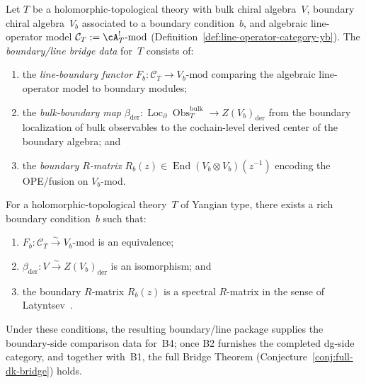 \begin{definition}
\label{def:boundary-line-bridge-data}
Let $T$ be a holomorphic-topological theory with bulk chiral
algebra~$V$, boundary chiral algebra~$V_b$ associated to a boundary
condition~$b$, and algebraic line-operator model
$\mathcal{C}_T := \cA_T^!\text{-}\mathrm{mod}$
(Definition~\ref{def:line-operator-category-yb}).
The \emph{boundary/line bridge data} for~$T$ consists of:
\begin{enumerate}[label=\textup{(\roman*)}]
\item the \emph{line-boundary functor}
 $F_b \colon \mathcal{C}_T \to V_b\text{-}\mathrm{mod}$
 comparing the algebraic line-operator model to boundary modules;
\item the \emph{bulk-boundary map}
 $\beta_{\mathrm{der}} \colon
 \operatorname{Loc}_{\partial}\operatorname{Obs}^{\mathrm{bulk}}_T
 \to Z(V_b)_{\mathrm{der}}$
 from the boundary localization of bulk observables to the
 cochain-level derived center of the boundary algebra; and
\item the \emph{boundary $R$-matrix}
 $R_b(z) \in \operatorname{End}(V_b \otimes V_b)(z^{-1})$
 encoding the OPE/fusion on $V_b$-mod.
\end{enumerate}
\end{definition}

\begin{conjecture}
\label{conj:boundary-line-bridge}
For a holomorphic-topological theory~$T$ of Yangian type, there
exists a rich boundary condition~$b$ such that:
\begin{enumerate}[label=\textup{(\alph*)}]
\item $F_b \colon \mathcal{C}_T \xrightarrow{\sim}
 V_b\text{-}\mathrm{mod}$ is an equivalence;
\item $\beta_{\mathrm{der}} \colon V \xrightarrow{\sim}
 Z(V_b)_{\mathrm{der}}$ is an isomorphism; and
\item the boundary $R$-matrix $R_b(z)$ is a spectral
 $R$-matrix in the sense of Latyntsev~\cite{Latyntsev23}.
\end{enumerate}
Under these conditions, the resulting boundary/line package supplies
the boundary-side comparison data for~B4; once B2 furnishes the
completed dg-side category, and together with~B1, the full Bridge Theorem
\textup{(}Conjecture~\textup{\ref{conj:full-dk-bridge}}\textup{)}
holds.
\end{conjecture}

